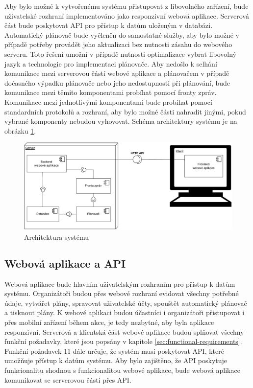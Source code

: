 Aby bylo možné k vytvořenému systému přistupovat z libovolného zařízení, bude uživatelské rozhraní implementováno jako responzivní webová aplikace. Serverová část 
bude poskytovat API pro přístup k datům uloženým v databázi. Automatický plánovač bude vyčleněn do samostatné služby, aby bylo možné v případě potřeby provádět
jeho aktualizaci bez nutnosti zásahu do webového serveru. Toto řešení umožní v případě nutnosti optimalizace vybrat libovolný jazyk a technologie pro implementaci plánovače.
Aby nedošlo k selhání komunikace mezi serverovou částí webové aplikace a plánovačem v případě dočasného výpadku plánovače nebo jeho nedostupnosti při plánování, bude komunikace
mezi těmito komponentami probíhat pomocí fronty zpráv. Komunikace mezi jednotlivými komponentami bude probíhat pomocí standardních protokolů a rozhraní, aby bylo možné
části nahradit jinými, pokud vybrané komponenty nebudou vyhovovat.
Schéma architektury systému je na obrázku \ref{fig:architecture}.

\begin{figure}[h]
    \centering
    \includegraphics[width=\textwidth]{chapters/images/architektura}
    \caption{Architektura systému}
    \label{fig:architecture}
\end{figure}

\subsection{Webová aplikace a API}

Webová aplikace bude hlavním uživatelským rozhraním pro přístup k datům systému. Organizátoři budou přes webové rozhraní evidovat všechny potřebné údaje, vytvářet plány,
spravovat uživatelské účty, spouštět automatický plánovač a tisknout plány. K webové aplikaci budou účastníci i organizátoři přistupovat i přes mobilní zařízení během akce, 
je tedy nezbytné, aby byla aplikace responzivní. Serverová a klientská část webové aplikace budou splňovat všechny funkční požadavky, které jsou popsány v kapitole \ref{sec:functional-requirements}.
Funkční požadavek 11 dále určuje, že systém musí poskytovat API, které umožňuje přístup k datům systému. Aby bylo zajištěno,
že API poskytuje funkcionalitu shodnou s funkcionalitou webové aplikace, bude webová aplikace komunikovat se serverovou částí přes API.

